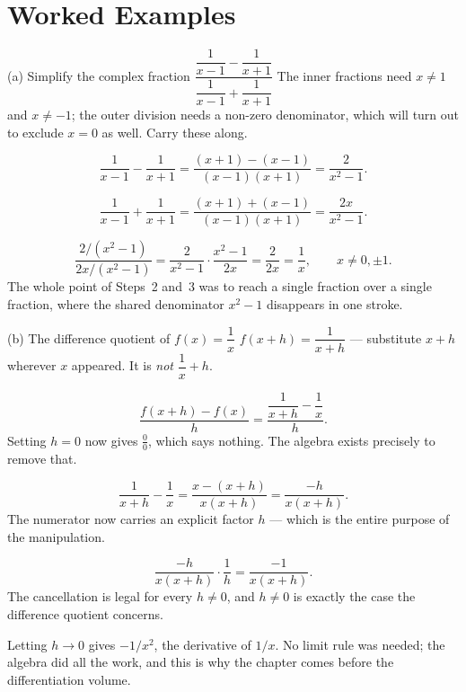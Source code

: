 \section{Worked Examples}

\begin{worked}{(a) Simplify the complex fraction $\dfrac{\dfrac{1}{x-1}-\dfrac{1}{x+1}}{\dfrac{1}{x-1}+\dfrac{1}{x+1}}$}
The inner fractions need $x\neq1$ and $x\neq-1$; the outer division needs a
non-zero denominator, which will turn out to exclude $x=0$ as well. Carry
these along.

\[
  \frac{1}{x-1}-\frac{1}{x+1}
  =\frac{(x+1)-(x-1)}{(x-1)(x+1)}
  =\frac{2}{x^{2}-1}.
\]

\[
  \frac{1}{x-1}+\frac{1}{x+1}
  =\frac{(x+1)+(x-1)}{(x-1)(x+1)}
  =\frac{2x}{x^{2}-1}.
\]

\[
  \frac{2/(x^{2}-1)}{2x/(x^{2}-1)}
  =\frac{2}{x^{2}-1}\cdot\frac{x^{2}-1}{2x}
  =\frac{2}{2x}
  =\boxed{\dfrac{1}{x}},\qquad x\neq0,\pm1 .
\]
The whole point of Steps~2 and~3 was to reach a single fraction over a
single fraction, where the shared denominator $x^{2}-1$ disappears in one
stroke.
\end{worked}

\begin{worked}{(b) The difference quotient of $f(x)=\dfrac1x$}
$f(x+h)=\dfrac{1}{x+h}$ --- substitute $x+h$ wherever $x$ appeared. It is
\emph{not} $\dfrac1x+h$.

\[
  \frac{f(x+h)-f(x)}{h}=\frac{\dfrac{1}{x+h}-\dfrac1x}{h}.
\]
Setting $h=0$ now gives $\tfrac00$, which says nothing. The algebra exists
precisely to remove that.

\[
  \frac{1}{x+h}-\frac1x=\frac{x-(x+h)}{x(x+h)}=\frac{-h}{x(x+h)} .
\]
The numerator now carries an explicit factor $h$ --- which is the entire
purpose of the manipulation.

\[
  \frac{-h}{x(x+h)}\cdot\frac1h=\frac{-1}{x(x+h)} .
\]
The cancellation is legal for every $h\neq0$, and $h\neq0$ is exactly the
case the difference quotient concerns.

Letting $h\to0$ gives $-1/x^{2}$, the derivative of $1/x$. No limit rule was
needed; the algebra did all the work, and this is why the chapter comes
before the differentiation volume.
\end{worked}

